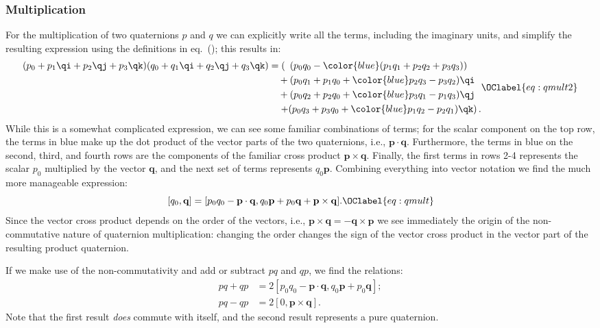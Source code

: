 \subsubsection{Multiplication}
For the multiplication of two quaternions $p$ and $q$ we can explicitly write all the terms, including the imaginary units, and simplify the resulting expression using the definitions in eq.~(); this results in:
\begin{equation}
\begin{split}
	(p_0 + p_1\qi+p_2\qj+p_3\qk)(q_0 + q_1\qi+q_2\qj+q_3\qk) &= \left(\,\,\,  (p_0q_0 - {\color{blue}(p_1q_1+ p_2q_2 + p_3q_3)}) \right.\\
&\quad+(p_0q_1 + p_1q_0 + {\color{blue}p_2q_3 - p_3q_2})\qi\\ 
&\quad+(p_0q_2 + p_2q_0 + {\color{blue}p_3q_1 - p_1q_3})\qj\\ 
&\quad\left.+(p_0q_3 + p_3q_0 + {\color{blue}p_1q_2 - p_2q_1})\qk \right).
\end{split}\OClabel{eq:qmult2}
\end{equation}
While this is a somewhat complicated expression, we can see some familiar combinations of terms; for the scalar component on the top row, the terms in blue make up the dot product of the vector parts of the two quaternions, i.e., $\mathbf{p}\cdot\mathbf{q}$. Furthermore, the terms in blue on the second, third, and fourth rows are the components of the familiar cross product $\mathbf{p}\times\mathbf{q}$.  Finally, the first terms in rows 2-4 represents the scalar $p_0$ multiplied by the vector $\mathbf{q}$, and the next set of terms represents $q_0\mathbf{p}$.  Combining everything into vector notation we find the much more manageable expression:
\begin{equation}
	[p_0,\mathbf{p}]\,[q_0,\mathbf{q}] = [ p_0q_0-\mathbf{p}\cdot\mathbf{q}, q_0\mathbf{p}+p_0\mathbf{q}+\mathbf{p}\times\mathbf{q} ].\OClabel{eq:qmult}
\end{equation}
Since the vector cross product depends on the order of the vectors, i.e., $\mathbf{p}\times\mathbf{q}=-\mathbf{q}\times\mathbf{p}$ we see immediately the origin of the non-commutative nature of quaternion multiplication: changing the order changes the sign of the vector cross product in the vector part of the resulting product quaternion.

If we make use of the non-commutativity and add or subtract $pq$ and $qp$, we find the relations:
\begin{equation}
\begin{split}
	pq+qp &= 2[ p_0q_0-\mathbf{p}\cdot\mathbf{q}, q_0\mathbf{p}+p_0\mathbf{q}];\\
	pq-qp &= 2[0,\mathbf{p}\times\mathbf{q}].
\end{split}
\end{equation}
Note that the first result \textit{does} commute with itself, and the second result represents a pure quaternion.

